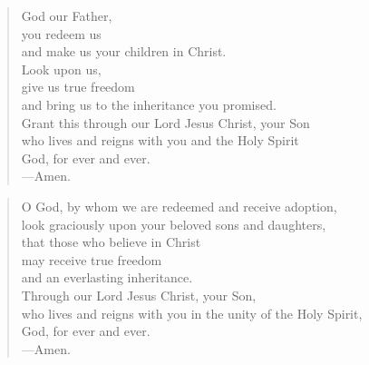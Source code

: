 \prayer

\setlength{\leftmargini}{\prayerleftmargini}

\begin{verse}
God our Father,\\
you redeem us\\
and make us your children in Christ.\\
Look upon us,\\
give us true freedom\\
and bring us to the inheritance you promised.\\
Grant this through our Lord Jesus Christ, your Son\\
who lives and reigns with you and the Holy Spirit\\
God, for ever and ever.\\
{\color{red}---\thinspace}Amen.
\end{verse}


\begin{verse}
O God, by whom we are redeemed and receive adoption,\\
look graciously upon your beloved sons and daughters,\\
that those who believe in Christ\\
may receive true freedom\\
and an everlasting inheritance.\\
Through our Lord Jesus Christ, your Son,\\
who lives and reigns with you in the unity of the Holy Spirit,\\
God, for ever and ever.\\
{\color{red}---\thinspace}Amen.
\end{verse}

\setlength{\leftmargini}{\defleftmargini}